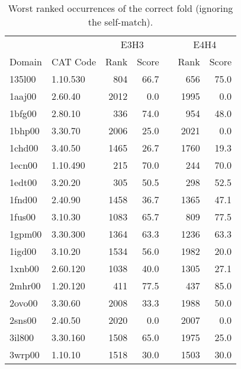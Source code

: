 \begin{table}
\begin{center}
\begin{tabular}{llrrlrr} \hline
        &               & \multicolumn{2}{c}{E3H3}&     &\multicolumn{2}{c}{E4H4} \\ \cline{3-4}\cline{6-7}
Domain  & CAT Code      & Rank  & Score         &       & Rank  & Score \\ \hline
135l00  & 1.10.530      & 804   & 66.7          &       & 656   & 75.0  \\
1aaj00  & 2.60.40       & 2012  & 0.0           &       & 1995  & 0.0   \\
1bfg00  & 2.80.10       & 336   & 74.0          &       & 954   & 48.0  \\
1bhp00  & 3.30.70       & 2006  & 25.0          &       & 2021  & 0.0   \\
1chd00  & 3.40.50       & 1465  & 26.7          &       & 1760  & 19.3  \\
1ecn00  & 1.10.490      & 215   & 70.0          &       & 244   & 70.0  \\
1edt00  & 3.20.20       & 305   & 50.5          &       & 298   & 52.5  \\
1fnd00  & 2.40.90       & 1458  & 36.7          &       & 1365  & 47.1  \\
1fus00  & 3.10.30       & 1083  & 65.7          &       & 809   & 77.5  \\
1gpm00  & 3.30.300      & 1364  & 63.3          &       & 1236  & 63.3  \\
1igd00  & 3.10.20       & 1534  & 56.0          &       & 1982  & 20.0  \\
1xnb00  & 2.60.120      & 1038  & 40.0          &       & 1305  & 27.1  \\
2mhr00  & 1.20.120      & 411   & 77.5          &       & 437   & 85.0  \\
2ovo00  & 3.30.60       & 2008  & 33.3          &       & 1988  & 50.0  \\
2sns00  & 2.40.50       & 2020  & 0.0           &       & 2007  & 0.0   \\
3il800  & 3.30.160      & 1508  & 65.0          &       & 1975  & 25.0  \\
3wrp00  & 1.10.10       & 1518  & 30.0          &       & 1503  & 30.0  \\ \hline
\end{tabular}
\end{center}
\caption{\label{tab:worst} Worst ranked occurrences of the correct fold (ignoring the self-match).}
\end{table}
